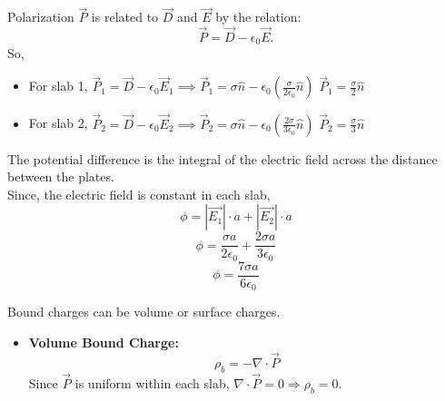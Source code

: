 \documentclass[a4paper]{article}
\begin{document}
\begin{tcolorbox}
\begin{tcolorbox}[
    title=Part (c),
    colframe=cyan!60, 
    colback=cyan!10,
    coltitle=black,
    fonttitle=\bfseries\large,
    breakable,
    enhanced,
    attach boxed title to top center={yshift=-2mm},
    boxed title style={colback=cyan!10, colframe=cyan!60}
]
Polarization $\vec{P}$ is related to $\vec{D}$ and $\vec{E} $ by the relation: 
\[
\vec{P} = \vec{D} - \epsilon_0 \vec{E}.
\]
So, 
\begin{itemize}
  \item For slab 1, \newline 
  $ \vec{P}_1 = \vec{D} - \epsilon_0 \vec{E}_1 
  \implies \vec{P}_1 = \sigma \hat{n} - \epsilon_0 \left(\frac{\sigma}{2\epsilon_0} \hat{n}\right) $ \newline 
  $ \boxed{\vec{P}_1 = \frac{\sigma}{2} \hat{n}} $
 \item For slab 2, \newline 
  $ \vec{P}_2 = \vec{D} - \epsilon_0 \vec{E}_2 
  \implies \vec{P}_2 = \sigma \hat{n} - \epsilon_0 \left(\frac{2\sigma}{3\epsilon_0} \hat{n}\right) $ \newline 
  $ \boxed{\vec{P}_2 = \frac{\sigma}{3} \hat{n}} $
\end{itemize}
\end{tcolorbox}
\begin{tcolorbox}[
    title=Part (d),
    colframe=cyan!60, 
    colback=cyan!10,
    coltitle=black,
    fonttitle=\bfseries\large,
    breakable,
    enhanced,
    attach boxed title to top center={yshift=-2mm},
    boxed title style={colback=cyan!10, colframe=cyan!60}
]
The potential difference is the integral of the electric field across the distance between the plates. \\
Since, the electric field is constant in each slab,
\[
\phi = |\vec{E_1}| \cdot a + |\vec{E_2}| \cdot a 
\]
\[
\phi = \frac{\sigma a}{2\epsilon_0} + \frac{2\sigma a}{3\epsilon_0} 
\]
\[
\boxed{\phi = \frac{7\sigma a}{6\epsilon_0}}
\]
\end{tcolorbox}
\begin{tcolorbox}[
    title=Part (e),
    colframe=cyan!60, 
    colback=cyan!10,
    coltitle=black,
    fonttitle=\bfseries\large,
    breakable,
    enhanced,
    attach boxed title to top center={yshift=-2mm},
    boxed title style={colback=cyan!10, colframe=cyan!60}
]
Bound charges can be volume or surface charges. \\
\begin{itemize}
\item \textbf{Volume Bound Charge:} 
  \[
    \rho_b = -\nabla \cdot \vec{P}
  \]
  Since $\vec{P}$ is uniform within each slab, $\nabla \cdot \vec{P} = 0 \Rightarrow \boxed{\rho_b = 0}$.
  

\end{itemize}
\end{tcolorbox}
\end{tcolorbox}
\end{document}
